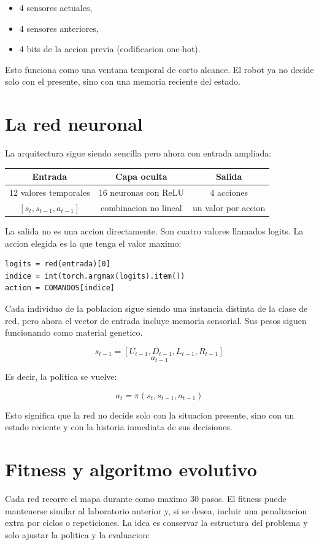 \documentclass[11pt,a4paper]{article}
\begin{document}
\begin{itemize}[leftmargin=*]
  \item 4 sensores actuales,
  \item 4 sensores anteriores,
  \item 4 bits de la accion previa (codificacion one-hot).
\end{itemize}

Esto funciona como una ventana temporal de corto alcance. El robot ya no decide solo con el presente, sino con una memoria reciente del estado.

\section{La red neuronal}
La arquitectura sigue siendo sencilla pero ahora con entrada ampliada:

\begin{center}
\begin{tabular}{c|c|c}
\toprule
Entrada & Capa oculta & Salida \\
\midrule
12 valores temporales & 16 neuronas con ReLU & 4 acciones \\
$[s_t, s_{t-1}, a_{t-1}]$ & combinacion no lineal & un valor por accion \\
\bottomrule
\end{tabular}
\end{center}

La salida no es una accion directamente. Son cuatro valores llamados logits. La accion elegida es la que tenga el valor maximo:

\begin{lstlisting}[style=python]
logits = red(entrada)[0]
indice = int(torch.argmax(logits).item())
action = COMANDOS[indice]
\end{lstlisting}

Cada individuo de la poblacion sigue siendo una instancia distinta de la clase de red, pero ahora el vector de entrada incluye memoria sensorial. Sus pesos siguen funcionando como material genetico.

\[
 s_{t-1} = [U_{t-1}, D_{t-1}, L_{t-1}, R_{t-1}]
\]
\[
 a_{t-1}
\]

Es decir, la politica se vuelve:

\[
 a_t = \pi(s_t, s_{t-1}, a_{t-1})
\]

Esto significa que la red no decide solo con la situacion presente, sino con un estado reciente y con la historia inmediata de sus decisiones.

\section{Fitness y algoritmo evolutivo}
Cada red recorre el mapa durante como maximo 30 pasos. El fitness puede mantenerse similar al laboratorio anterior y, si se desea, incluir una penalizacion extra por ciclos o repeticiones. La idea es conservar la estructura del problema y solo ajustar la politica y la evaluacion:
\end{document}

